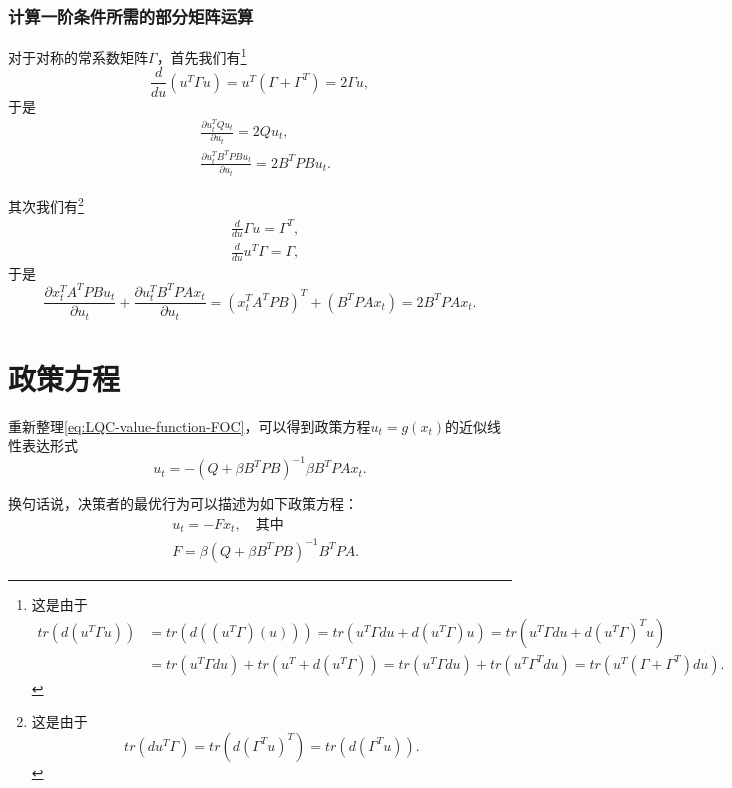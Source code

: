 \subsubsection{计算一阶条件所需的部分矩阵运算}
\label{sec:LQC-value-function-FOC-math}

对于对称的常系数矩阵$\Gamma$，首先我们有\footnote{这是由于\begin{align*}
  tr(d(u^T \Gamma u)) &= tr(d((u^T \Gamma)(u))) = tr(u^T \Gamma du + d(u^T \Gamma) u) = tr(u^T \Gamma du + d(u^T \Gamma)^T u) \\
  &=tr(u^T \Gamma du) + tr(u^T + d(u^T \Gamma)) = tr(u^T \Gamma du) + tr(u^T \Gamma^T du) = tr(u^T (\Gamma + \Gamma^T) du).
\end{align*}}
\begin{equation*}
  \frac{d}{du}(u^T \Gamma u)= u^T (\Gamma + \Gamma^T) = 2 \Gamma u,
\end{equation*}
于是
\begin{align*}
  &\frac{\partial u_t^T Q u_t}{\partial u_t} = 2 Q u_t, \\
  &\frac{\partial u_t^T B^T P B u_t}{\partial u_t} = 2 B^T P B u_t.
\end{align*}

其次我们有\footnote{这是由于
\begin{equation*}
  tr(d u^T \Gamma) = tr(d(\Gamma^T u)^T) = tr(d (\Gamma^T u)).
\end{equation*}}
\begin{align*}
  &\frac{d}{d u} \Gamma u = \Gamma^T, \\
  &\frac{d}{d u} u^T \Gamma = \Gamma,
\end{align*}
于是
\begin{equation*}
  \frac{\partial x_t^T A^T P B u_t}{\partial u_t} + \frac{\partial u_t^T B^T P A x_t}{\partial u_t} = (x_t^T A^T P B)^T + (B^T P A x_t) = 2 B^T P A x_t.
\end{equation*}

\section{政策方程}
\label{sec:linear-policy-function}
重新整理\eqref{eq:LQC-value-function-FOC}，可以得到政策方程$u_t=g(x_t)$的近似线性表达形式
\begin{equation}
  \label{eq:LQC-linear-policy-func}
  u_t = -\left(Q + \beta B^T P B\right)^{-1} \beta B^T P A x_t.
\end{equation}

换句话说，决策者的最优行为可以描述为如下政策方程：
\begin{align}
  \label{eq:LQC-linear-policy-function}
  &u_t = -F x_t, \quad \text{其中}\\
  \label{eq:LQC-linear-policy-F}
  &F = \beta \left(Q + \beta B^T P B \right)^{-1} B^T P A.
\end{align}

